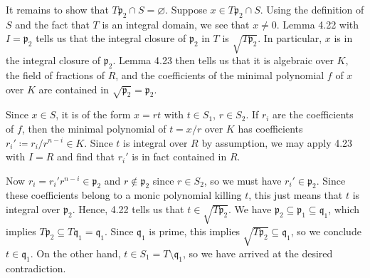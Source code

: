 It remains to show that $T \mathfrak{p}_2 \cap S = \varnothing$. Suppose
$x \in T \mathfrak{p}_2 \cap S$. Using the definition of $S$ and the fact that
$T$ is an integral domain, we see that $x\neq 0$. Lemma 4.22 with $I = \mathfrak{p}_2$
tells us that the integral closure of  $\mathfrak{p}_2$ in $T$ is $\sqrt{T \mathfrak{p}_2}$.
In particular, $x$ is in the integral closure of $\mathfrak{p}_2$. Lemma
4.23 then tells us that it is algebraic over $K$, the field of fractions of $R$,
and the coefficients of the minimal polynomial $f$ of $x$ over $K$ are contained
in $\sqrt{\mathfrak{p}_2} = \mathfrak{p}_2$.

Since $x \in S$, it is of the form $x=rt$ with $t \in S_1$, $r \in S_2$. If
$r_i$ are the coefficients of $f$, then the minimal polynomial of $t = x/r$ over $K$ has
coefficients $r_i' \coloneqq r_i/r^{n-i} \in K$. Since $t$ is integral over $R$ by assumption, we may apply
4.23 with $I = R$ and find that $r_i'$ is in fact contained in $R$.

Now $r_i = r_i'r^{n-i} \in \mathfrak{p}_2$ and $r \notin \mathfrak{p}_2$ since
$r \in S_2$, so we must have $r_i' \in \mathfrak{p}_2$. Since these coefficients
belong to  a monic polynomial killing $t$, this just means that $t$ is integral
over $\mathfrak{p}_2$. Hence, 4.22 tells us that $t \in \sqrt{T \mathfrak{p}_2}$.
We have
$\mathfrak{p}_2 \subseteq \mathfrak{p}_1 \subseteq \mathfrak{q}_1$, which
implies $T \mathfrak{p}_2 \subseteq T \mathfrak{q}_1 = \mathfrak{q}_1$. Since
$\mathfrak{q}_1$ is prime, this implies $\sqrt{T \mathfrak{p}_2} \subseteq \mathfrak{q}_1$,
so we conclude $t \in \mathfrak{q}_1$.
On the other hand, $t \in S_1 = T\setminus \mathfrak{q}_1$, so we have
arrived at the desired contradiction.
